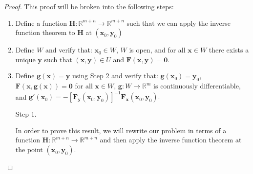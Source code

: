 \documentclass{article}
\newcommand{\R}{\mathbb{R}}
\newcommand{\x}{\mathbf{x}}
\newcommand{\F}{\mathbf{F}}
\newcommand{\y}{\mathbf{y}}
\newcommand{\g}{\mathbf{g}}
\newcommand{\ze}{\mathbf{0}}
\theoremstyle{definition}
\begin{document}
	\begin{proof}
		This proof will be broken into the following steps: 
		\begin{enumerate}
			\item Define a function $ \mathbf H:\R^{m+n}\to \R^{m+n} $ such that we can apply the inverse function theorem to $ \mathbf H $ at $ (\x_0,\y_0) $
			\item Define $ W $ and verify that: $ \x_0\in W $, $ W $ is open, and for all $ \x\in W $ there exists a unique $ \y $ such that $ (\x,\y)\in U $ and $ \F(\x,\y)=\ze $. 
			\item Define $ \g(\x) =\y$ using Step 2 and verify that: $ \g(\x_0)=\y_0 $, $ \mathbf F(\x,\g(\x))=\ze $ for all $ \x\in W $,  $ \mathbf g:W\to\R^m $ is continuously differentiable, and
			$ \g'(\x_0) = -[\mathbf F_\y(\x_0,\y_0)]^{-1}\mathbf F_\x(\x_0,\y_0).$
		\end{enumerate}
		\begin{enumerate}
			\item [Step 1.]
			
			In order to prove this result, we will rewrite our problem in terms of a function $ \mathbf H:\R^{m+n}\to \R^{m+n} $ and then apply the inverse function theorem at the point $ (\x_0,\y_0) $. 
			

\end{enumerate}
\end{proof}
\end{document}
